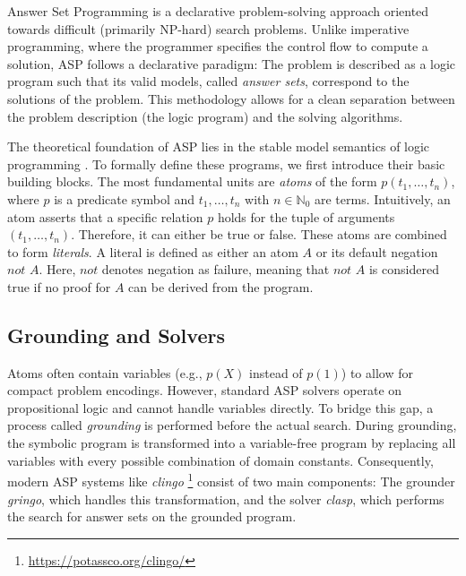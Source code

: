 \documentclass[
     11pt,                    %
     a4paper,             %
     BCOR=10mm,     %
     DIV=14,                 %
     listof=totoc,                    %
     bibliography=totoc,       %
     index=totoc,              %
     parskip            %
     twoside,
     headsepline
     ]{scrreprt}
\theoremstyle{definition}
\theoremstyle{definition}
\theoremstyle{remark}
\theoremstyle{bfnote}
\begin{document}
Answer Set Programming is a declarative problem-solving approach oriented towards difficult (primarily NP-hard) search problems. Unlike imperative programming, where the programmer specifies the control flow to compute a solution, ASP follows a declarative paradigm: The problem is described as a logic program such that its valid models, called \textit{answer sets}, correspond to the solutions of the problem. This methodology allows for a clean separation between the problem description (the logic program) and the solving algorithms.

The theoretical foundation of ASP lies in the stable model semantics of logic programming \parencite{gel88}. To formally define these programs, we first introduce their basic building blocks.
The most fundamental units are \textit{atoms} of the form $p(t_1, \dots, t_n)$, where $p$ is a predicate symbol and $t_1, \dots, t_n$ with $n \in \mathbb {N}_0$ are terms.
Intuitively, an atom asserts that a specific relation $p$ holds for the tuple of arguments $(t_1, \dots, t_n)$. Therefore, it can either be true or false. 
These atoms are combined to form \textit{literals}. A literal is defined as either an atom $A$ or its default negation $\textit{not } A$. Here, $\textit{not}$ denotes negation as failure, meaning that $\textit{not } A$ is considered true if no proof for $A$ can be derived from the program.

\subsection*{Grounding and Solvers}
Atoms often contain variables (e.g., $p(X)$ instead of $p(1)$) to allow for compact problem encodings. However, standard ASP solvers operate on propositional logic and cannot handle variables directly. To bridge this gap, a process called \textit{grounding} is performed before the actual search. During grounding, the symbolic program is transformed into a variable-free program by replacing all variables with every possible combination of domain constants.
Consequently, modern ASP systems like \textit{clingo} \footnote{\url{https://potassco.org/clingo/}} consist of two main components: The grounder \textit{gringo}, which handles this transformation, and the solver \textit{clasp}, which performs the search for answer sets on the grounded program.
\end{document}
